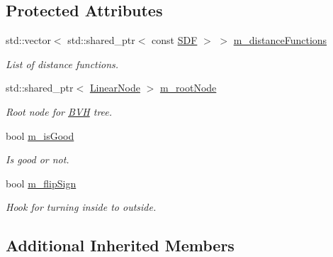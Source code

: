 \subsection*{Protected Attributes}
\begin{DoxyCompactItemize}
\item 
\mbox{\label{classUnionBVH_a026a103a13d0b04bedb6dabd50e4da69}} 
std\+::vector$<$ std\+::shared\+\_\+ptr$<$ const \hyperlink{classUnionBVH_a5d1d64d7cabf1000fc1a804d06e103cc}{S\+DF} $>$ $>$ \hyperlink{classUnionBVH_a026a103a13d0b04bedb6dabd50e4da69}{m\+\_\+distance\+Functions}
\begin{DoxyCompactList}\small\item\em List of distance functions. \end{DoxyCompactList}\item 
\mbox{\label{classUnionBVH_ad59be4f96e0f020c28f4677dcb94a004}} 
std\+::shared\+\_\+ptr$<$ \hyperlink{classUnionBVH_a25cac5a9dc5396299f06399434ebe212}{Linear\+Node} $>$ \hyperlink{classUnionBVH_ad59be4f96e0f020c28f4677dcb94a004}{m\+\_\+root\+Node}
\begin{DoxyCompactList}\small\item\em Root node for \hyperlink{namespaceBVH}{B\+VH} tree. \end{DoxyCompactList}\item 
\mbox{\label{classUnionBVH_a2c3a008bd61f225a83c959f2280b9649}} 
bool \hyperlink{classUnionBVH_a2c3a008bd61f225a83c959f2280b9649}{m\+\_\+is\+Good}
\begin{DoxyCompactList}\small\item\em Is good or not. \end{DoxyCompactList}\item 
\mbox{\label{classUnionBVH_a0782d93bd0a7bff7580a99e6fef285c7}} 
bool \hyperlink{classUnionBVH_a0782d93bd0a7bff7580a99e6fef285c7}{m\+\_\+flip\+Sign}
\begin{DoxyCompactList}\small\item\em Hook for turning inside to outside. \end{DoxyCompactList}\end{DoxyCompactItemize}
\subsection*{Additional Inherited Members}


